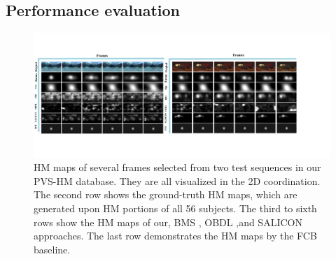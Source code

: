 \documentclass[10pt,journal,compsoc]{IEEEtran}
\begin{document}
\subsection{Performance evaluation}
\label{compare}

\begin{figure}
	\begin{center}
		\centerline{\includegraphics[width=2\columnwidth]{figures/experiment/objective_result_1}}%
		\caption{\footnotesize{HM maps of several frames selected from two test sequences in our PVS-HM database. They are all visualized in the 2D coordination.  The second row shows the ground-truth HM maps, which are generated upon HM portions of all 56 subjects. The third to sixth rows show the HM maps of our, BMS \cite{zhang2016exploiting} , OBDL \cite{hossein2015many},and {SALICON} approaches. The last row demonstrates the HM maps by the FCB baseline.}}
		\label{figure-object}
	\end{center}
\end{figure}
\end{document}
